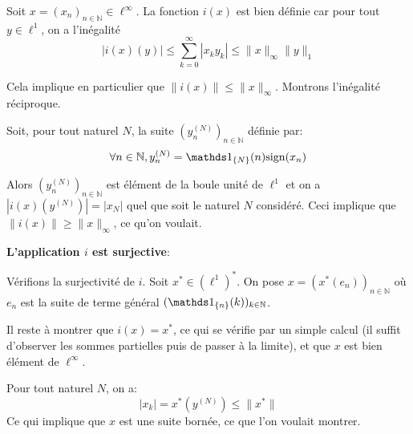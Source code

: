 Soit $x=(x_n)_{n\in\mathbb{N}}\in\ell^\infty$. La fonction $i(x)$
est bien définie car pour tout $y\in \ell^1$, on a l'inégalité
$$|i(x)(y)|\leq \sum_{k=0}^\infty |x_ky_k|\leq \|x\|_\infty \|y\|_1$$

Cela implique en particulier que $\|i(x)\|\leq\|x\|_\infty$. Montrons l'inégalité
réciproque.

Soit, pour tout naturel $N$, la suite $(y^{(N)}_n)_{n\in\mathbb{N}}$
définie par:
$$\forall n\in\mathbb{N} , y_n^{(N)}= \ind_{\{N\}}(n)\mathrm{sign}(x_n)$$

Alors $(y^{(N)}_n)_{n\in\mathbb{N}}$ est élément de la boule unité
de $\ell^1$ et on a $|i(x)(y^{(N)})| = |x_N|$ quel que soit
le naturel $N$ considéré.
Ceci implique que $\|i(x)\|\geq \|x\|_\infty$, ce qu'on voulait. \newline

\textbf{L'application $i$ est surjective}:

Vérifions la surjectivité de $i$.
Soit $x^*\in (\ell^1)^*$. On pose $x = (x^*(e_n))_{n\in\mathbb{N}}$ où $e_n$
est la suite de terme général $(\ind_{\{n\}}(k))_{k\in\mathbb{N}}$.

Il reste à montrer que $i(x) = x^*$, ce qui se vérifie par
un simple calcul (il suffit d'observer les sommes partielles
puis de passer à la limite), et que $x$ est bien élément de $\ell^\infty$.

Pour tout naturel $N$, on a:
$$|x_k| = x^*(y^{(N)})\leq \|x^*\|$$
Ce qui implique que $x$ est
une suite bornée, ce que l'on voulait montrer.


